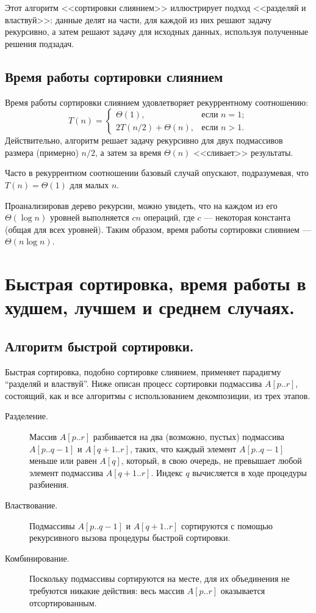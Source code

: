 \documentclass[a4paper,12pt]{article}
\begin{document}
Этот алгоритм <<сортировки слиянием>> иллюстрирует подход <<разделяй и властвуй>>: данные делят на части, для каждой из них решают задачу рекурсивно, а затем решают задачу для исходных данных, используя полученные решения подзадач.

\subsection*{Время работы сортировки слиянием}
Время работы сортировки слиянием удовлетворяет рекуррентному соотношению:
\begin{displaymath}
T(n) = \left\{
\begin{array}{ll}
\Theta(1), & \textrm{если }n = 1;\\
2T(n / 2) + \Theta(n), & \textrm{если }n > 1.
\end{array}
\right.
\end{displaymath}
Действительно, алгоритм решает задачу рекурсивно для двух подмассивов размера (примерно) $n/2$, а затем за время $\Theta(n)$ <<сливает>> результаты.

Часто в рекуррентном соотношении базовый случай опускают, подразумевая, что $T(n) = \Theta(1)$ для малых $n$.


Проанализировав дерево рекурсии, можно увидеть, что на каждом из его $\Theta(\log n)$ уровней выполняется $cn$ операций, где $c$ --- некоторая константа (общая для всех уровней). Таким образом, время работы сортировки слиянием --- $\Theta(n \log n)$.
\newpage
\section{Быстрая сортировка, время работы в худшем, лучшем и среднем случаях.}

\subsection{Алгоритм быстрой сортировки.}

Быстрая сортировка, подобно сортировке слиянием, применяет парадигму ``разделяй и властвуй''. Ниже описан процесс сортировки подмассива \(A[p..r]\), состоящий, как и все алгоритмы с использованием декомпозиции, из трех этапов.

\begin{description}
	\item[Разделение.] Массив \(A[p..r]\) разбивается на два (возможно, пустых) подмассива \(A[p..q - 1]\) и \(A[q + 1..r]\), таких, что каждый элемент \(A[p..q - 1]\) меньше или равен \(A[q]\), который, в свою очередь, не превышает любой элемент подмассива \(A[q + 1..r]\). Индекс \(q\) вычисляется в ходе процедуры разбиения.
	
	\item[Властвование.] Подмассивы \(A[p..q - 1]\) и \(A[q + 1..r]\) сортируются с помощью рекурсивного вызова процедуры быстрой сортировки.
	
	\item[Комбинирование.] Поскольку подмассивы сортируются на месте, для их объединения не требуются никакие действия: весь массив \(A[p..r]\) оказывается
	отсортированным.
\end{description}
\end{document}
